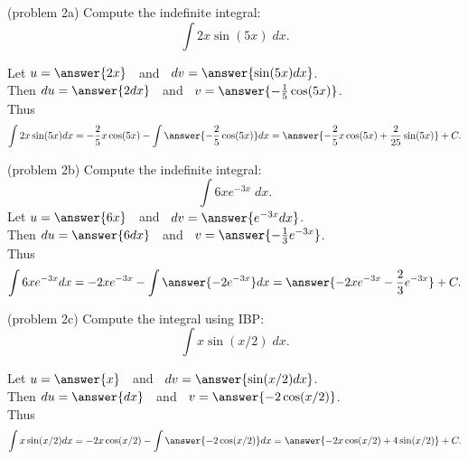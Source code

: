 \documentclass[handout]{ximera}
\begin{document}
\begin{problem}(problem 2a)
Compute the indefinite integral:
  \[
  \int 2x\sin(5x)\;dx.
  \]

Let $u = \answer{2x}\;\;$   and   $\;\;dv = \answer{\sin(5x) dx}$.\\
  Then $du = \answer{2 dx}\;\;$   and   $\;\; v = \answer{-\frac15 \cos(5x)}$.\\
  Thus 
  \[
  \int 2x\sin(5x) dx = -\frac25 x\cos(5x) - \int \answer{-\frac25 \cos(5x)} dx = \answer{-\frac25 x\cos(5x) +\frac{2}{25} \sin(5x)} + C.
  \]
  
\end{problem}


\begin{problem}(problem 2b)
Compute the indefinite integral:
  \[
  \int 6xe^{-3x} \;dx.
  \]
Let $u = \answer{6x}\;\;$   and   $\;\;dv = \answer{e^{-3x} dx}$.\\
  Then $du = \answer{6 dx}\;\;$   and   $\;\;v = \answer{-\frac13 e^{-3x}}$.\\
  Thus 
  \[
  \int 6xe^{-3x} dx = -2 xe^{-3x} -\int \answer{-2 e^{-3x}} dx = \answer{-2 xe^{-3x} - \frac23 e^{-3x}} + C.
  \]
  
\end{problem}


\begin{problem}(problem 2c)
Compute the integral using IBP:
  \[
  \int x\sin(x/2) \;dx.
  \]

Let $u = \answer{x}\;\;$   and   $\;\;dv = \answer{\sin(x/2) dx}$.\\
  Then $du = \answer{ dx}\;\;$   and   $\;\;v = \answer{-2 \cos(x/2)}$.\\
  Thus 
  \[
  \int x\sin(x/2) dx = -2x\cos(x/2) - \int \answer{-2 \cos(x/2)} dx = \answer{-2x\cos(x/2) + 4 \sin(x/2)} + C.
  \]
  
\end{problem}
\end{document}
